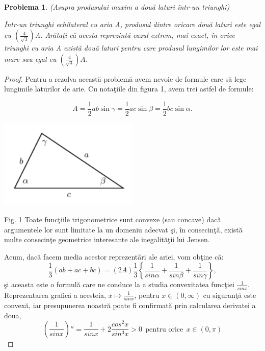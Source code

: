 \documentclass[a4paper,12pt,oneside]{report}
\newtheorem{problem}{Problema}
\begin{document}
\begin{problem}(Asupra produsului maxim a dou\u{a} laturi \^{i}ntr-un triunghi)

\^{I}ntr-un triunghi echilateral cu aria A, produsul dintre oricare dou\u{a} laturi este egal cu \(\left (\frac{4}{\sqrt{3}}  \right )\)A. Ar\u{a}ta\c{t}i c\u{a} acesta reprezint\u{a} cazul extrem, mai exact, \^{i}n orice triunghi cu aria A  exist\u{a} dou\u{a} laturi pentru care produsul lungimilor lor este mai mare sau egal cu \(\left (\frac{4}{\sqrt{3}}  \right )A\).
\end{problem}
\begin{proof}
  Pentru a rezolva aceast\u{a} problem\u{a} avem nevoie de formule care s\u{a} lege lungimile laturilor de arie. Cu nota\c{t}iile din figura 1, avem trei astfel de formule:

\begin{displaymath}
  A = \frac{1}{2}ab \sin\gamma = \frac{1}{2}ac \sin \beta = \frac{1}{2}bc \sin \alpha.
\end{displaymath}
\begin{center}
    \includegraphics[width=0.5\textwidth]{fig2.1.png}
\end{center}

Fig. 1  Toate func\c{t}iile trigonometrice sunt convexe (sau concave) dac\u{a}
argumentele lor sunt limitate la un domeniu adecvat \c{s}i, \^{i}n consecin\c{t}\u{a},
exist\u{a} multe consecin\c{t}e geometrice interesante ale inegalit\u{a}\c{t}ii lui Jensen.


Acum, dac\u{a} facem media acestor reprezent\u{a}ri ale ariei, vom ob\c{t}ine c\u{a}:
\begin{displaymath}
  \frac{1}{3}\left ( ab + ac + bc \right )= \left ( 2A \right )\frac{1}{3}\left \{ \frac{1}{sin \alpha } + \frac{1}{sin \beta } + \frac{1}{sin \gamma }\right \}, \label{eq:2.1} \tag{2.1}
\end{displaymath}
\c{s}i aceasta este o formul\u{a} care ne conduce la a studia convexitatea func\c{t}iei \(\frac{1}{sin x}\). Reprezentarea grafic\u{a} a acesteia, \(x \mapsto \frac{1}{sin x}\), pentru \(x\in \left ( 0, \infty  \right )\) cu siguran\c{t}\u{a} este convex\u{a}, iar presupunerea noastr\u{a} poate fi confirmat\u{a} prin calcularea derivatei a doua,
\begin{displaymath}
  {\left ( \frac{1}{sin x} \right )}''= \frac{1}{sin x} + 2\frac{cos^{2}x}{sin ^{3}x}> 0~~ \text{pentru orice}~~ x\in \left ( 0, \pi  \right )  \label{eq:2.2} \tag{2.2}
\end{displaymath}


\end{proof}
\end{document}
